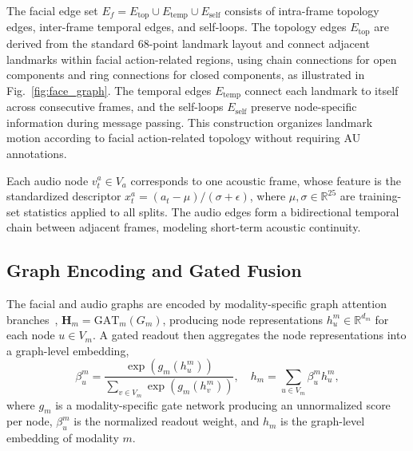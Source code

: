 \documentclass[conference]{IEEEtran}
\begin{document}
The facial edge set \(E_f = E_{\mathrm{top}} \cup E_{\mathrm{temp}} \cup E_{\mathrm{self}}\) consists of intra-frame topology edges, inter-frame temporal edges, and self-loops. The topology edges \(E_{\mathrm{top}}\) are derived from the standard 68-point landmark layout and connect adjacent landmarks within facial action-related regions, using chain connections for open components and ring connections for closed components, as illustrated in Fig.~\ref{fig:face_graph}. The temporal edges \(E_{\mathrm{temp}}\) connect each landmark to itself across consecutive frames, and the self-loops \(E_{\mathrm{self}}\) preserve node-specific information during message passing. This construction organizes landmark motion according to facial action-related topology without requiring AU annotations.

Each audio node \(v^a_t \in V_a\) corresponds to one acoustic frame, whose feature is the standardized descriptor \(x^a_t = (a_t - \mu)/(\sigma + \epsilon)\), where \(\mu,\sigma \in \mathbb{R}^{25}\) are training-set statistics applied to all splits. The audio edges form a bidirectional temporal chain between adjacent frames, modeling short-term acoustic continuity.

\subsection{Graph Encoding and Gated Fusion}

The facial and audio graphs are encoded by modality-specific graph attention branches~\cite{velickovic2018graph}, \(\mathbf{H}_m = \mathrm{GAT}_m(G_m)\), producing node representations \(h^m_u \in \mathbb{R}^{d_m}\) for each node \(u \in V_m\). A gated readout then aggregates the node representations into a graph-level embedding,
\begin{equation}
\beta^m_u =
\frac{\exp(g_m(h^m_u))}
{\sum_{v \in V_m}\exp(g_m(h^m_v))},
\quad
h_m = \sum_{u \in V_m} \beta^m_u h^m_u ,
\end{equation}
where \(g_m\) is a modality-specific gate network producing an unnormalized score per node, \(\beta^m_u\) is the normalized readout weight, and \(h_m\) is the graph-level embedding of modality \(m\).
\end{document}
